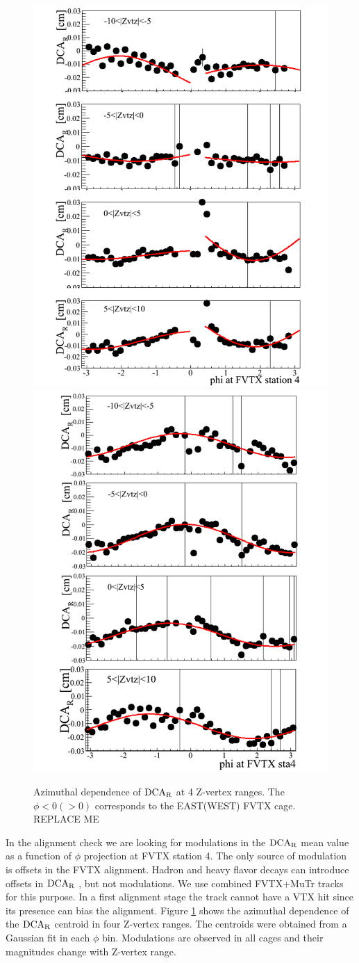 \documentclass[12pt]{article}
\newcommand{\dcar}{$\rm{DCA}_{R}$ }
\begin{document}
\begin{figure}
	\includegraphics[width=0.49\linewidth]{Figures/dcar_phi_z_south}
	\includegraphics[width=0.49\linewidth]{Figures/dcar_phi_z_north}
	\caption{Azimuthal dependence of \dcar at 4 Z-vertex ranges. The $\phi<0(>0)$ corresponds to the EAST(WEST) FVTX cage.{\color{red} REPLACE ME}}
	\label{fig:dcar_phi_z}
\end{figure}

In the alignment check we are looking for modulations in the \dcar mean value as a function of $\phi$ projection at FVTX station 4. 
The only source of modulation is offsets in the FVTX alignment. Hadron and heavy flavor decays can introduce offsets in \dcar, but not modulations. 
We use combined FVTX+MuTr tracks for this purpose. In a first alignment stage the track cannot have a VTX hit since its presence can bias the alignment. 
Figure \ref{fig:dcar_phi_z} shows the azimuthal dependence of the \dcar centroid in four Z-vertex ranges. The centroids were obtained from a Gaussian 
fit in each $\phi$ bin. Modulations are observed in all cages and their magnitudes change with Z-vertex range. 
\end{document}
